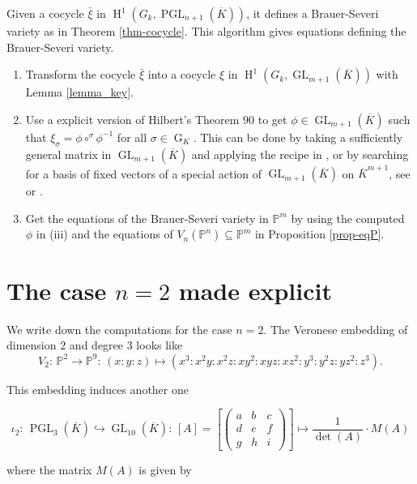 \documentclass[a4paper,10pt]{amsart}
\theoremstyle{plain}
\theoremstyle{definition}
\theoremstyle{remark}
\numberwithin{equation}{section}
\begin{document}
	Given a cocycle $\bar{\xi}$ in $\operatorname{H}^1(G_k,\operatorname{PGL}_{n+1}(\overline{K}))$, it defines a Brauer-Severi variety as in Theorem \ref{thm-cocycle}. This algorithm gives equations defining the Brauer-Severi variety.
	\begin{enumerate}
	\item Transform the cocycle $\bar{\xi}$ into a cocycle $\xi$ in $\operatorname{H}^1(G_k,\operatorname{GL}_{m+1}(\overline{K}))$ with Lemma \ref{lemma_key}.
	\item Use a explicit version of Hilbert's Theorem $90$ to get  $\phi\in\operatorname{GL}_{m+1}(\overline{K})$ such that $\xi_\sigma=\phi\circ^{\sigma}\phi^{-1}$ for all $\sigma\in\operatorname{G}_K$. This can be done by taking a sufficiently general matrix in $\operatorname{GL}_{m+1}(\overline{K})$ and applying the recipe in \cite[Prop. 3, p. 159]{SeL}, or by searching for a basis of fixed vectors of a special action of $\operatorname{GL}_{m+1}(\overline{K})$ on $\overline{K}^{m+1}$, see \cite[Section 1.2]{Loth} or \cite[Section 3]{Lo}.
	\item Get the equations of the Brauer-Severi variety in $\mathbb{P}^m$ by using the computed $\phi$ in (iii) and the equations of $V_n(\mathbb{P}^{n})\subseteq\mathbb{P}^{m}$ in Proposition \ref{prop-eqP}. 
\end{enumerate}

\section{The case $n=2$ made explicit}

We write down the computations for the case $n=2$. The Veronese embedding of dimension $2$ and degree $3$ looks like
$$
V_2:\,\mathbb{P}^2\rightarrow\mathbb{P}^{9}:\,(x:y:z)\mapsto(x^3:x^2y:x^2z:xy^2:xyz:xz^2:y^3:y^2z:yz^2:z^3).
$$

This embedding induces another one

$$
\iota_2:\,\operatorname{PGL}_{3}(\overline{K})\hookrightarrow\operatorname{GL}_{10}(\overline{K}):\,[A]=\left[\begin{pmatrix}a & b & c \\ d & e & f \\ g & h & i \end{pmatrix}\right]\mapsto\frac{1}{\operatorname{det}(A)}\cdot M(A)
$$

where the matrix $M(A)$ is given by

\vspace{3mm}
\end{document}
